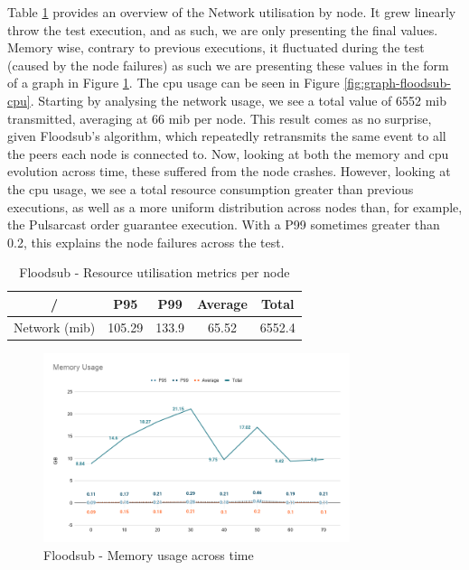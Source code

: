 Table \ref{table:floodsub} provides an overview of the Network utilisation by
node. It grew linearly throw the test execution, and as such, we are only
presenting the final values. Memory wise, contrary to previous executions, it
fluctuated during the test (caused by the node failures) as such we are
presenting these values in the form of a graph in Figure
\ref{fig:graph-floodsub-memory}. The \acrshort{cpu} usage can be seen in Figure
\ref{fig:graph-floodsub-cpu}. Starting by analysing the network usage, we see a
total value of 6552 \acrshort{mib} transmitted, averaging at 66 \acrshort{mib}
per node. This result comes as no surprise, given Floodsub's algorithm, which
repeatedly retransmits the same event to all the peers each node is connected
to. Now, looking at both the memory and \acrshort{cpu} evolution across time,
these suffered from the node crashes.  However, looking at the \acrshort{cpu}
usage, we see a total resource consumption greater than previous executions, as
well as a more uniform distribution across nodes than, for example, the
Pulsarcast order guarantee execution. With a P99 sometimes greater than 0.2,
this explains the node failures across the test.

\begin{table}[!htb]
\caption{Floodsub - Resource utilisation metrics per node}
\label{table:floodsub}
  \begin{center}
   \begin{tabular}{|c| c c c c|} 
   \hline
   / & P95 & P99 & Average & Total \\ [0.5ex] 
   \hline\hline
   Network (\acrshort{mib}) & 105.29 & 133.9 & 65.52 & 6552.4 \\
   \hline
  \end{tabular}
  \end{center}
\end{table}

\begin{figure}[!htb]
  \centering
  \includegraphics[width=0.8\textwidth]{img/graph-floodsub-memory.png}
  \caption{Floodsub - Memory usage across time}
  \label{fig:graph-floodsub-memory}
\end{figure}

